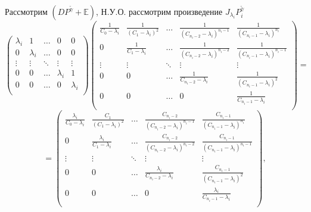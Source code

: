 \documentclass[12pt, a4paper]{article}
\begin{document}
\quad Рассмотрим $\left(DP^{\widetilde{\gamma}} + \mathds{E}\right)$, Н.У.О. рассмотрим произведение $J_{\lambda_i} P_i^{\widetilde{\gamma}}$
\[
\left(
\begin{array}{ccccc}
\lambda_i & 1 & \dots & 0 & 0 \\
0 & \lambda_i & \dots & 0 & 0 \\
\vdots & \vdots & \ddots & \vdots & \vdots\\
0 & 0 & \dots & \lambda_i & 1 \\
0 & 0 & \dots & 0 & \lambda_i \\
\end{array}
\right)
\left(
\begin{array}{ccccc}
\displaystyle\frac{1}{C_0-\lambda_i} & \displaystyle\frac{1}{(C_1-\lambda_i)^2} & \dots & \displaystyle\frac{1}{(C_{n_i-2}-\lambda_i)^{n_i-1}} & \displaystyle\frac{1}{(C_{n_i-1}-\lambda_i)^{n_i}} \\
0 & \displaystyle\frac{1}{C_1-\lambda_i} & \dots & \displaystyle\frac{1}{(C_{n_i-2}-\lambda_i)^{n_i-2}} & \displaystyle\frac{1}{(C_{n_i-1}-\lambda_i)^{n_i-1}} \\
\vdots & \vdots & \ddots & \vdots & \vdots\\
0 & 0 & \dots & \displaystyle\frac{1}{C_{n_i-2}-\lambda_i} & \displaystyle\frac{1}{(C_{n_i-1}-\lambda_i)^2} \\
0 & 0 & \dots & 0 & \displaystyle\frac{1}{C_{n_i-1}-\lambda_i} \\
\end{array}
\right) = 
\]
\[
= \left(
\begin{array}{ccccc}
\displaystyle\frac{\lambda_i}{C_0-\lambda_i} & \displaystyle\frac{C_1}{(C_1-\lambda_i)^2} & \dots & \displaystyle\frac{C_{n_i-2}}{(C_{n_i-2}-\lambda_i)^{n_i-1}} & \displaystyle\frac{C_{n_i-1}}{(C_{n_i-1}-\lambda_i)^{n_i}} \\
0 & \displaystyle\frac{\lambda_i}{C_1-\lambda_i} & \dots & \displaystyle\frac{C_{n_i-2}}{(C_{n_i-2}-\lambda_i)^{n_i-2}} & \displaystyle\frac{C_{n_i-1}}{(C_{n_i-1}-\lambda_i)^{n_i-1}} \\
\vdots & \vdots & \ddots & \vdots & \vdots\\
0 & 0 & \dots & \displaystyle\frac{\lambda_i}{C_{n_i-2}-\lambda_i} & \displaystyle\frac{C_{n_i-1}}{(C_{n_i-1}-\lambda_i)^2} \\
0 & 0 & \dots & 0 & \displaystyle\frac{\lambda_i}{C_{n_i-1}-\lambda_i} \\
\end{array}
\right),
\]
\end{document}
